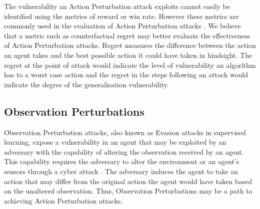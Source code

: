 \documentclass[conference,compsoc]{IEEEtran}
\begin{document}
The vulnerability an Action Perturbation attack exploits cannot easily be identified using the metrics of reward or win rate. However these metrics are commonly used in the evaluation of Action Perturbation attacks \cite{lee_query-based_2021, lee_spatiotemporally_2020, tessler_action_2019, guo_edge_2021, weng_toward_2020}. We believe that a metric such as counterfactual regret \cite{zinkevich_regret_2007} may better evaluate the effectiveness of Action Perturbation attacks. Regret measures the difference between the action an agent takes and the best possible action it could have taken in hindsight. The regret at the point of attack would indicate the level of vulnerability an algorithm has to a worst case action and the regret in the steps following an attack would indicate the degree of the generalisation vulnerability.







\subsection{Observation Perturbations}

Observation Perturbation attacks, also known as Evasion attacks \cite{tabassi_taxonomy_2019} in supervised learning, expose a vulnerability in an agent that may be exploited by an adversary with the capability of altering the observation received by an agent. This capability requires the adversary to alter the environment \cite{brown_adversarial_2017} or an agent's sensors through a cyber attack \cite{ferdowsi_robust_2018}. The adversary induces the agent to take an action that may differ from the original action the agent would have taken based on the unaltered observation. Thus, Observation Perturbations may be a path to achieving Action Perturbation attacks.
\end{document}
